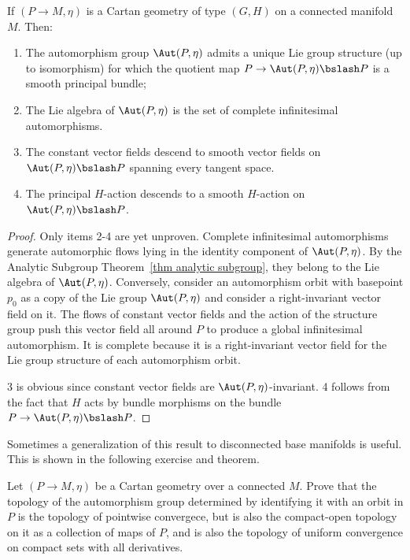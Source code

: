 \begin{thm}\label{thm 12.13 McKay}
    If $(P\to M,\eta)$ is a Cartan geometry of type $(G,H)$ on a connected manifold $M$. Then:
    \begin{enumerate}
        \item The automorphism group $\Aut(P,\eta)$ admits a unique Lie group structure (up to isomorphism) for which the quotient map $P\to \Aut(P,\eta)\bslash P$ is a smooth principal bundle;
        \item The Lie algebra of $\Aut(P,\eta)$ is the set of complete infinitesimal automorphisms. 
        \item The constant vector fields descend to smooth vector fields on $\Aut(P,\eta)\bslash P$ spanning every tangent space.
        \item The principal $H$-action descends to a smooth $H$-action on $\Aut(P,\eta)\bslash P$.
    \end{enumerate} 
\end{thm}
\begin{proof}
    Only items 2-4 are yet unproven. Complete infinitesimal automorphisms generate automorphic flows lying in the identity component of $\Aut(P,\eta)$. By the Analytic Subgroup Theorem~\ref{thm analytic subgroup}, they belong to the Lie algebra of $\Aut(P,\eta)$. Conversely, consider an automorphism orbit with basepoint $p_0$ as a copy of the Lie group $\Aut(P,\eta)$ and consider a right-invariant vector field on it. The flows of constant vector fields and the action of the structure group push this vector field all around $P$ to produce a global infinitesimal automorphism. It is complete because it is a right-invariant vector field for the Lie group structure of each automorphism orbit.

    3 is obvious since constant vector fields are $\Aut(P,\eta)$-invariant. 4 follows from the fact that $H$ acts by bundle morphisms on the bundle $P\to \Aut(P,\eta)\bslash P$. 
\end{proof}

Sometimes a generalization of this result to disconnected base manifolds is useful. This is shown in the following exercise and theorem.

\begin{xca}
    Let $(P\to M,\eta)$ be a Cartan geometry over a connected $M$. Prove that the topology of the automorphism group determined by identifying it with an orbit in $P$ is the topology of pointwise convergece, but is also the compact-open topology on it as a collection of maps of $P$, and is also the topology of uniform convergence on compact sets with all derivatives.
\end{xca}

